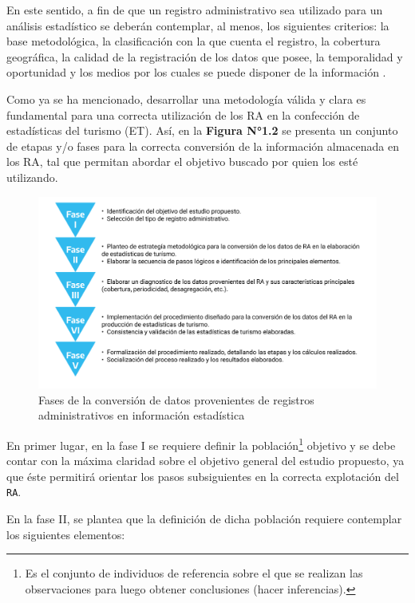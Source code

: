 \documentclass[
]{book}
\begin{document}
En este sentido, a fin de que un registro administrativo sea utilizado para un análisis estadístico se deberán contemplar, al menos, los siguientes criterios: la base metodológica, la clasificación con la que cuenta el registro, la cobertura geográfica, la calidad de la registración de los datos que posee, la temporalidad y oportunidad y los medios por los cuales se puede disponer de la información \citep{inegi2006}.

Como ya se ha mencionado, desarrollar una metodología válida y clara es fundamental para una correcta utilización de los RA en la confección de estadísticas del turismo (ET). Así, en la \textbf{Figura N°1.2} se presenta un conjunto de etapas y/o fases para la correcta conversión de la información almacenada en los RA, tal que permitan abordar el objetivo buscado por quien los esté utilizando.

\begin{figure}

{\centering \includegraphics[width=0.8\linewidth]{imagenes/figura02} 

}

\caption{Fases de la conversión de datos provenientes de registros administrativos en información estadística}\label{fig:Fases}
\end{figure}

En primer lugar, en la fase I se requiere definir la población\footnote{Es el conjunto de individuos de referencia sobre el que se realizan las observaciones para luego obtener conclusiones (hacer inferencias).} objetivo y se debe contar con la máxima claridad sobre el objetivo general del estudio propuesto, ya que éste permitirá orientar los pasos subsiguientes en la correcta explotación del \texttt{RA}.

En la fase II, se plantea que la definición de dicha población requiere contemplar los siguientes elementos:
\end{document}
